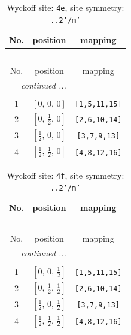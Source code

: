 \documentclass[fleqn,8pt]{jsarticle}
\begin{document}
\begin{longtable}{ccc}
\caption{Wyckoff site: {\tt 4e}, site symmetry: {\tt ..2'/m'}}
 \\
 \hline \hline
No. & position & mapping \\ \hline \endfirsthead

\multicolumn{2}{l}{\tablename\ \thetable{}} \\
 \hline \hline
No. & position & mapping \\ \hline \endhead

 \hline \hline
\multicolumn{2}{r}{\footnotesize\it continued ...} \\ \endfoot

 \hline \hline
\multicolumn{2}{r}{} \\ \endlastfoot

1 & $\left[ 0,\, 0,\, 0 \right]$ & {\tt [1,5,11,15]} \\ \hline
2 & $\left[ 0,\, \frac{1}{2},\, 0 \right]$ & {\tt [2,6,10,14]} \\ \hline
3 & $\left[ \frac{1}{2},\, 0,\, 0 \right]$ & {\tt [3,7,9,13]} \\ \hline
4 & $\left[ \frac{1}{2},\, \frac{1}{2},\, 0 \right]$ & {\tt [4,8,12,16]} \\
\end{longtable}
\renewcommand{\arraystretch}{1.2}
\begin{longtable}{ccc}
\caption{Wyckoff site: {\tt 4f}, site symmetry: {\tt ..2'/m'}}
 \\
 \hline \hline
No. & position & mapping \\ \hline \endfirsthead

\multicolumn{2}{l}{\tablename\ \thetable{}} \\
 \hline \hline
No. & position & mapping \\ \hline \endhead

 \hline \hline
\multicolumn{2}{r}{\footnotesize\it continued ...} \\ \endfoot

 \hline \hline
\multicolumn{2}{r}{} \\ \endlastfoot

1 & $\left[ 0,\, 0,\, \frac{1}{2} \right]$ & {\tt [1,5,11,15]} \\ \hline
2 & $\left[ 0,\, \frac{1}{2},\, \frac{1}{2} \right]$ & {\tt [2,6,10,14]} \\ \hline
3 & $\left[ \frac{1}{2},\, 0,\, \frac{1}{2} \right]$ & {\tt [3,7,9,13]} \\ \hline
4 & $\left[ \frac{1}{2},\, \frac{1}{2},\, \frac{1}{2} \right]$ & {\tt [4,8,12,16]} \\
\end{longtable}
\end{document}
